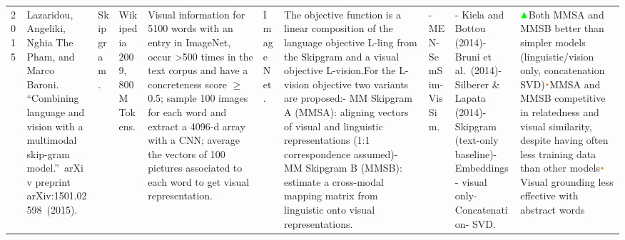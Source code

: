 \documentclass[
]{krantz}
\begin{document}
\begin{longtable}[]{@{}llllllllll@{}}
\begin{minipage}[t]{0.00\columnwidth}
2015\strut
\end{minipage} & \begin{minipage}[t]{0.06\columnwidth}\raggedright
Lazaridou, Angeliki, Nghia The Pham, and Marco Baroni. ``Combining language and vision with a multimodal skip-gram model.''~arXiv preprint arXiv:1501.02598~(2015).\strut
\end{minipage} & \begin{minipage}[t]{0.04\columnwidth}\raggedright
Skipgram.\strut
\end{minipage} & \begin{minipage}[t]{0.02\columnwidth}\raggedright
Wikipedia 2009, 800M Tokens.\strut
\end{minipage} & \begin{minipage}[t]{0.07\columnwidth}\raggedright
Visual information for 5100 words with an entry in ImageNet, occur \textgreater500 times in the text corpus and have a~ concreteness score \(\geq\) 0.5; sample 100 images for each word and extract a 4096-d array with a CNN; average the vectors of 100 pictures associated to each word to get visual representation.\strut
\end{minipage} & \begin{minipage}[t]{0.05\columnwidth}\raggedright
ImageNet.\strut
\end{minipage} & \begin{minipage}[t]{0.25\columnwidth}\raggedright
The objective function is a linear composition of the language objective L-ling from the Skipgram and a visual objective L-vision.For the L-vision objective two variants are proposed:- MM Skipgram A (MMSA): aligning vectors of visual and linguistic representations (1:1 correspondence assumed)- MM Skipgram B (MMSB): estimate a cross-modal mapping matrix from linguistic onto visual representations.\strut
\end{minipage} & \begin{minipage}[t]{0.08\columnwidth}\raggedright
- MEN- SemSim- VisSim.\strut
\end{minipage} & \begin{minipage}[t]{0.05\columnwidth}\raggedright
- Kiela and Bottou (2014)- Bruni et al.~(2014)- Silberer \& Lapata (2014)- Skipgram (text-only baseline)- Embeddings - visual only- Concatenation- SVD.\strut
\end{minipage} & \begin{minipage}[t]{0.13\columnwidth}\raggedright
\(\color{green}\blacktriangle\)Both MMSA and MMSB better than simpler models (linguistic/vision only, concatenation SVD)\(\color{orange}\bullet\)MMSA and MMSB competitive in relatedness and visual similarity, despite having often less training data than other models\(\color{orange}\bullet\)Visual grounding less effective with abstract words\strut

\end{minipage}
\end{longtable}
\end{document}
